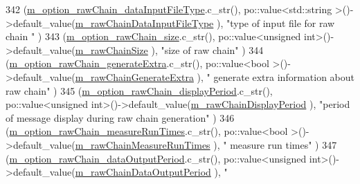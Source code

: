 \begin{DoxyCode}
342     (\hyperlink{class_q_u_e_s_o_1_1_m_l_sampling_level_options_a530bd244a5f0e9ef40f9be18ec2dae49}{m\_option\_rawChain\_dataInputFileType}.c\_str(),                 
      po::value<std::string >()->default\_value(\hyperlink{class_q_u_e_s_o_1_1_m_l_sampling_level_options_af216317de1aba551bfddd2be38e26898}{m\_rawChainDataInputFileType}                ), \textcolor{stringliteral}{
      "type of input file for raw chain "}                               )
343     (\hyperlink{class_q_u_e_s_o_1_1_m_l_sampling_level_options_a21f76f865e40198fc83406f617e396c1}{m\_option\_rawChain\_size}.c\_str(),                              po::value<unsigned
       int>()->default\_value(\hyperlink{class_q_u_e_s_o_1_1_m_l_sampling_level_options_a8ab85efacd9881ab35b9f01b6e4fc5a3}{m\_rawChainSize}                             ), \textcolor{stringliteral}{"size of raw chain"}       
                                              )
344     (\hyperlink{class_q_u_e_s_o_1_1_m_l_sampling_level_options_a775bb8dfb4e5f2a0069667586eb1b336}{m\_option\_rawChain\_generateExtra}.c\_str(),                     
      po::value<bool        >()->default\_value(\hyperlink{class_q_u_e_s_o_1_1_m_l_sampling_level_options_ab0dda87d92a759b277d07157def23174}{m\_rawChainGenerateExtra}                    ), \textcolor{stringliteral}{"
      generate extra information about raw chain"}                      )
345     (\hyperlink{class_q_u_e_s_o_1_1_m_l_sampling_level_options_ad71a6b65d66c81154cabef647419cff0}{m\_option\_rawChain\_displayPeriod}.c\_str(),                     
      po::value<unsigned int>()->default\_value(\hyperlink{class_q_u_e_s_o_1_1_m_l_sampling_level_options_a6d0e080a6b428a8e6c8fed14c597c883}{m\_rawChainDisplayPeriod}                    ), \textcolor{stringliteral}{"period
       of message display during raw chain generation"}           )
346     (\hyperlink{class_q_u_e_s_o_1_1_m_l_sampling_level_options_a0dab337e638625987315c34660d8846e}{m\_option\_rawChain\_measureRunTimes}.c\_str(),                   
      po::value<bool        >()->default\_value(\hyperlink{class_q_u_e_s_o_1_1_m_l_sampling_level_options_ad93ee62195c418eedb55877009102cab}{m\_rawChainMeasureRunTimes}                  ), \textcolor{stringliteral}{"
      measure run times"}                                               )
347     (\hyperlink{class_q_u_e_s_o_1_1_m_l_sampling_level_options_a6fd76d8d884e3432274110a02f98086b}{m\_option\_rawChain\_dataOutputPeriod}.c\_str(),                  
      po::value<unsigned int>()->default\_value(\hyperlink{class_q_u_e_s_o_1_1_m_l_sampling_level_options_a8fdb68e6d3e91f0334293f2ee009aded}{m\_rawChainDataOutputPeriod}                 ), \textcolor{stringliteral}{"
}
\end{DoxyCode}
